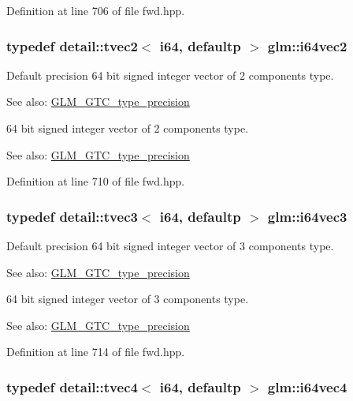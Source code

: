 Definition at line 706 of file fwd.hpp.\hypertarget{group__gtc__type__precision_g75461c98baf3e3913566550bd9d8d17f}{
\subsubsection[i64vec2]{\setlength{\rightskip}{0pt plus 5cm}typedef detail::tvec2$<$ i64, defaultp $>$ {\bf glm::i64vec2}}}
\label{group__gtc__type__precision_g75461c98baf3e3913566550bd9d8d17f}


Default precision 64 bit signed integer vector of 2 components type. \begin{Desc}
\item[See also:]\hyperlink{group__gtc__type__precision}{GLM\_\-GTC\_\-type\_\-precision}\end{Desc}
64 bit signed integer vector of 2 components type. \begin{Desc}
\item[See also:]\hyperlink{group__gtc__type__precision}{GLM\_\-GTC\_\-type\_\-precision} \end{Desc}


Definition at line 710 of file fwd.hpp.\hypertarget{group__gtc__type__precision_gb6eefcd7eb24e4142ed23dc1e87163a6}{
\subsubsection[i64vec3]{\setlength{\rightskip}{0pt plus 5cm}typedef detail::tvec3$<$ i64, defaultp $>$ {\bf glm::i64vec3}}}
\label{group__gtc__type__precision_gb6eefcd7eb24e4142ed23dc1e87163a6}


Default precision 64 bit signed integer vector of 3 components type. \begin{Desc}
\item[See also:]\hyperlink{group__gtc__type__precision}{GLM\_\-GTC\_\-type\_\-precision}\end{Desc}
64 bit signed integer vector of 3 components type. \begin{Desc}
\item[See also:]\hyperlink{group__gtc__type__precision}{GLM\_\-GTC\_\-type\_\-precision} \end{Desc}


Definition at line 714 of file fwd.hpp.\hypertarget{group__gtc__type__precision_g19846034cab6ee6e031884ea30def7fc}{
\subsubsection[i64vec4]{\setlength{\rightskip}{0pt plus 5cm}typedef detail::tvec4$<$ i64, defaultp $>$ {\bf glm::i64vec4}}}
\label{group__gtc__type__precision_g19846034cab6ee6e031884ea30def7fc}


